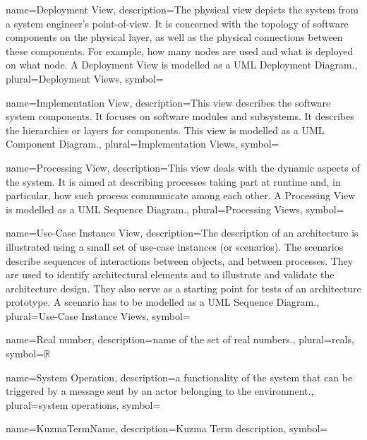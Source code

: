 {name={Deployment View},
description={The physical view depicts the system from a system engineer's
point-of-view. It is concerned with the topology of software components on the
physical layer, as well as the physical connections between these components.
For example, how many nodes are used and what is deployed on what node. A
Deployment View is modelled as a UML Deployment Diagram.}, 
plural={Deployment Views}, 
symbol={}
}


{name={Implementation View},
description={This view describes the software system components. It focuses on
software modules and subsystems. It describes the hierarchies or layers for
components. This view is modelled as a UML Component Diagram.},
plural={Implementation Views}, 
symbol={}
}


{name={Processing View},
description={This view deals with the dynamic aspects of the system. It is
aimed at describing processes taking part at runtime and, in particular, how
such process communicate among each other. A Processing View is modelled as a
UML Sequence Diagram.},
plural={Processing Views}, 
symbol={}
}


{name={Use-Case Instance View},
description={The description of an architecture is illustrated using a small set
of use-case instances (or scenarios). The scenarios describe sequences of
interactions between objects, and between processes. They are used to identify
architectural elements and to illustrate and validate the architecture design.
They also serve as a starting point for tests of an architecture prototype. A
scenario has to be modelled as a UML Sequence Diagram.}, 
plural={Use-Case Instance Views}, 
symbol={}
}

{name={Real number},
description={name of the set of real numbers.},
plural={reals},
symbol={\ensuremath{\mathbb{R}}}
}

{name={System Operation},
description={a functionality of the system that can be triggered by a message
sent by an actor belonging to the environment.}, plural={system operations},
symbol={}
}

{name={KuzmaTermName},
description={Kuzma Term description},
symbol={} 
}

